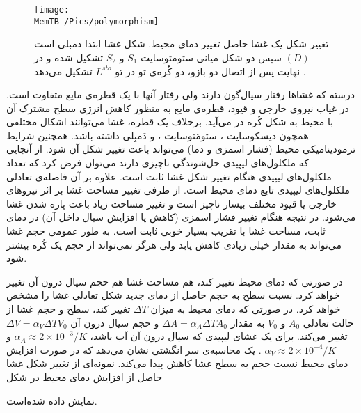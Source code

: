 \begin{figure}[h]
\begin{center}
\texttt{[image: \\MemTB /Pics/polymorphism]}
\caption{
تغییر شکل یک غشا حاصل تغییر دمای محیط. شکل غشا ابتدا دمبلی است 
$(D)$
سپس دو شکل میانی ستومتوسایت
$S_1$
و
$S_2$
تشکیل شده و در نهایت پس از اتصال دو بازو، دو کُره‌ی تو در تو 
$L^{sto}$
تشکیل می‌دهد 
\cite{Berndl1990EPL}.
}
\label{fig:allAtom}
\end{center}
\end{figure}

درسته که غشاها رفتار سیال‌گون دارند ولی رفتار آنها با یک قطره‌ی مایع متفاوت است. در غیاب نیروی خارجی و قیود، قطره‌ی مایع به منظور کاهش انرژی سطح مشترک آن با محیط به شکل کُره در می‌آید. برخلاف یک قطره، غشا می‌توانند اشکال مختلفی همچون دیسکوسایت
، ستومَتوسایت
، و  دَمبِلی داشته باشد. همچنین شرایط ترمودینامیکی محیط (فشار اسمزی و دما) می‌تواند باعث تغییر شکل آن شود. از آنجایی که ملکلول‌های لیپیدی حل‌شوندگی ناچیزی دارند می‌توان فرض کرد که تعداد ملکلول‌های لیپیدی هنگام تغییر شکل غشا ثابت است. علاوه بر آن فاصله‌ی تعادلی ملکلول‌های لیپیدی تابع دمای محیط است. از طرفی تغییر مساحت غشا بر اثر نیرو‌های خارجی یا قیود مختلف بیسار ناچیز است و تغییر مساحت زیاد باعث پاره شدن غشا می‌شود. در نتیجه هنگام تغییر فشار اسمزی (کاهش یا افزایش سیال داخل آن)  در دمای ثابت، مساحت غشا با تقریب بسیار خوبی ثابت است. به طور عمومی حجم غشا می‌تواند به مقدار خیلی زیادی کاهش یابد ولی هرگز نمی‌تواند از حجم یک کُره بیشتر شود. 

در صورتی که دمای محیط تغییر کند، هم مساحت غشا هم حجم سیال درون آن تغییر خواهد کرد. نسبت سطح به حجم حاصل از دمای جدید شکل تعادلی غشا را مشخص خواهد کرد. در صورتی که دمای محیط به میزان 
$\Delta T$
تغییر کند، سطح و حجم غشا از حالت تعادلی
$A_0$
و
$V_0$
به مقدار 
$\Delta A=\alpha_A\Delta T A_0$
و حجم سیال درون آن 
$\Delta V=\alpha_V\Delta T V_0$
تغییر می‌کند. برای یک غشای لیپیدی که سیال درون آن آب باشد،
$\alpha_A\approx2\times 10^{-3}/K$
و
$\alpha_V\approx2\times 10^{-4}/K$
. یک محاسبه‌ی سر انگشتی نشان می‌دهد که در صورت افزایش دمای محیط نسبت حجم به سطح غشا کاهش پیدا می‌کند. نمونه‌ای از تغییر شکل غشا حاصل از افزایش دمای محیط در شکل 

نمایش داده شده‌است.

